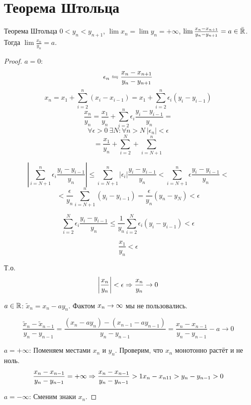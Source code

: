 ﻿\section{Теорема Штольца}
\begin{theorem}{Теорема Штольца}
$0<y_n<y_{n+1}$, $\lim x_n = \lim y_n = +\infty$, $\lim \frac{x_n-x_{n+1}}{y_n-y_{n+1}} = a \in \bar{\mathbb{R}}$.
Тогда $\lim \frac{x_n}{y_n} = a$.
\end{theorem}
\begin{proof}
$a = 0$:
$$\epsilon_n \leftrightharpoons \frac{x_n - x_{n+1}}{y_n - y_{n+1}}$$
$$x_n = x_1 + \sum_{i=2}^n (x_i - x_{i-1}) = x_1 + \sum_{i=2}^n \epsilon_i(y_i - y_{i-1})$$
$$\frac{x_n}{y_n} = \frac{x_1}{y_n} + \sum_{i=2}^n \epsilon_i \frac{y_i - y_{i-1}}{y_n} = $$
$$\forall \epsilon > 0\: \exists N\colon \forall n > N\: |\epsilon_n| < \epsilon$$
$$= \frac{x_1}{y_n} + \sum_{i=2}^N + \sum_{i=N+1}^n$$

$$\left|\sum_{i=N+1}^n \epsilon_i \frac{y_i - y_{i-1}}{y_n}\right| \leqslant \sum_{i=N+1}^n |\epsilon_i| \frac{y_i - y_{i-1}}{y_n} < 
\sum_{i=N+1}^n \epsilon \frac{y_i - y_{i-1}}{y_n} <$$
$$< \frac{\epsilon}{y_n}\sum_{i=N+1}^n (y_i - y_{i-1}) = \frac{\epsilon}{y_n} (y_n - y_N) < \epsilon$$

$$\sum_{i=2}^N \epsilon_i \frac{y_i - y_{i-1}}{y_n} \leqslant \frac{1}{y_n}\sum_{i=2}^N \epsilon_i(y_i - y_{i-1}) < \epsilon$$

$$\frac{x_1}{y_n} < \epsilon$$

Т.о.
$$\left|\frac{x_n}{y_n}\right| < \epsilon \Rightarrow \frac{x_n}{y_n} \rightarrow 0$$

$a\in\mathbb{R}$:
$\tilde x_n = x_n - a y_n$. Фактом $x_n\rightarrow\infty$ мы не пользовались.

$$\frac{\tilde x_n - \tilde x_{n - 1}}{y_n - y_{n - 1}} = \frac{(x_n - ay_n) - (x_{n - 1} - ay_{n - 1})}{y_n - y_{n - 1}} = \frac{x_n - x_{n - 1}}{y_n - y_{n - 1}} - a \to 0$$

$a=+\infty$: Поменяем местами $x_n$ и $y_n$. Проверим, что $x_n$ монотонно растёт и не ноль.
$$\frac{x_n - x_{n-1}}{y_n - y_{n-1}} = +\infty \Rightarrow \frac{x_n - x_{n-1}}{y_n - y_{n-1}} > 1 x_n - x_{n11} > y_n - y_{n-1} > 0$$

$a=-\infty$: Сменим знаки $x_n$.
\end{proof}